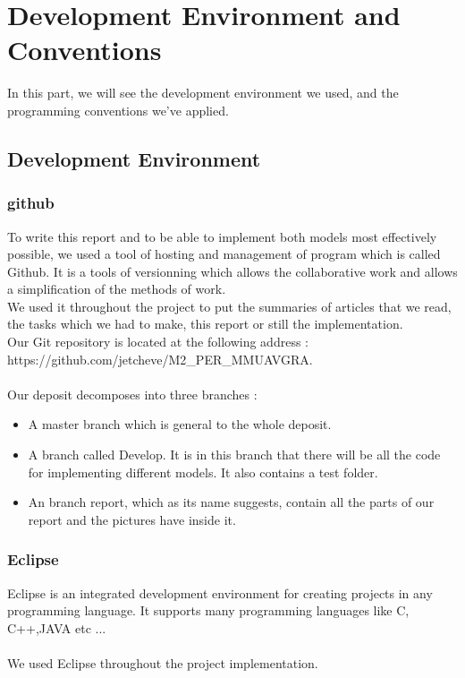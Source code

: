 \chapter{Development Environment and Conventions}
In this part, we will see the development environment we used, and the programming conventions we've applied.

\section{Development Environment}

\subsection{github}

To write this report and to be able to implement both models most effectively possible, we used a tool of hosting and management of program which is called Github. It is a tools of versionning which allows the collaborative work and allows a simplification of the methods of work. \\
We used it throughout the project to put the summaries of articles that we read, the tasks which we had to make, this report or still the implementation.\\
Our Git repository is located at the following address :
https://github.com/jetcheve/M2\_PER\_MMUAVGRA.\\\\

Our deposit decomposes into three branches :
\begin{itemize}
\item A master branch which is general to the whole deposit.
\item A branch called Develop. It is in this branch that there will be all the code for implementing different models. It also contains a test folder. 
\item An branch report, which as its name suggests, contain all the parts of our report and the pictures have inside it.
\end{itemize}

\subsection{Eclipse}
Eclipse is an integrated development environment for creating projects in any programming language. It supports many programming languages ​​like C, C++,JAVA etc ...\\\\
We used Eclipse throughout the project implementation.

